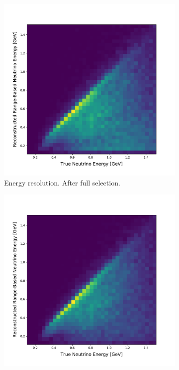 \begin{figure}[ht]
\begin{center}
\begin{subfigure}[b]{0.45\textwidth}
    \end{subfigure} \newline
    \begin{subfigure}[b]{0.45\textwidth}
    \centering
    \includegraphics[width=1.00\textwidth]{NuMuCCsel/Images/Ryan/RangeBasedEnergyResolution.pdf}
    \caption{\label{fig:NuMUCCsel:ryan:Eres_noPQuality} Energy resolution. After full selection.}
    \end{subfigure}
    \begin{subfigure}[b]{0.45\textwidth}
    \centering
    \includegraphics[width=1.00\textwidth]{NuMuCCsel/Images/Ryan/RangeBasedEnergyResolution_pquality.pdf}

\end{subfigure}
\end{center}
\end{figure}
